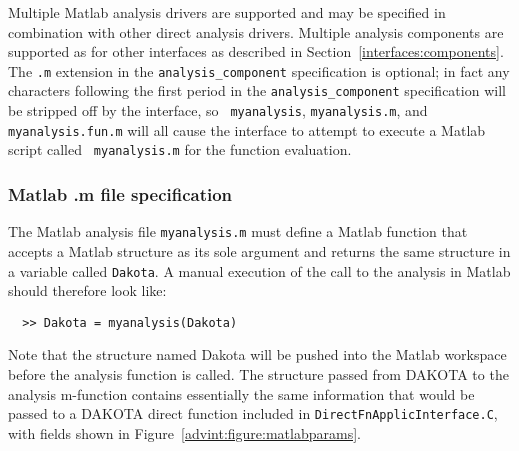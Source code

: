 Multiple Matlab analysis drivers are supported and may be specified in
combination with other direct analysis drivers.  Multiple analysis
components are supported as for other interfaces as described in
Section~\ref{interfaces:components}.  The {\tt .m} extension in the
{\tt analysis\_component} specification is optional; in fact any
characters following the first period in the {\tt analysis\_component}
specification will be stripped off by the interface, so {\tt
myanalysis}, {\tt myanalysis.m}, and {\tt myanalysis.fun.m} will all
cause the interface to attempt to execute a Matlab script called {\tt
myanalysis.m} for the function evaluation.

\subsubsection{Matlab .m file specification}

The Matlab analysis file {\tt myanalysis.m} must define a Matlab
function that accepts a Matlab structure as its sole argument and
returns the same structure in a variable called {\tt Dakota}.  A
manual execution of the call to the analysis in Matlab should
therefore look like:
\begin{small}
\begin{verbatim}
  >> Dakota = myanalysis(Dakota)
\end{verbatim} 
\end{small}
Note that the structure named Dakota will be pushed into the Matlab
workspace before the analysis function is called.  The structure
passed from DAKOTA to the analysis m-function contains essentially the
same information that would be passed to a DAKOTA direct function
included in {\tt DirectFnApplicInterface.C}, with fields shown in
Figure~\ref{advint:figure:matlabparams}.


